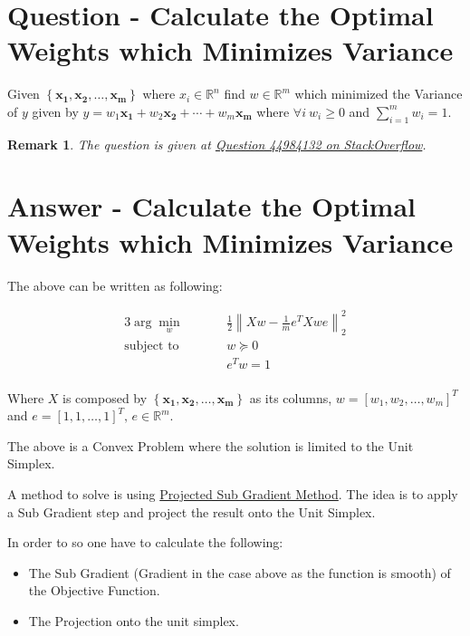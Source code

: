 \documentclass[]{article}
\newtheorem*{remark}{Remark}
\newcommand{\MyBrack}[1]{\left\lbrack #1 \right\rbrack}
\newcommand{\MyBrace}[1]{\left\lbrace #1 \right\rbrace}
\newcommand{\MyNormSqr}[2]{{\left\| #1 \right\|}_{#2}^{2}}
\newcommand{\MyNormTwoSqr}[1]{\MyNormSqr{#1}{2}}
\newcommand{\RR}[1]{\mathbb{R}^{#1}}
\begin{document}
	
	\section*{Question - Calculate the Optimal Weights which Minimizes Variance}
	
	Given $ \MyBrace{ \boldsymbol{{x}_{1}}, \boldsymbol{{x}_{2}}, \ldots, \boldsymbol{{x}_{m}} } $ where $ {x}_{i} \in \RR{n} $ find $ w \in \RR{m} $ which minimized the Variance of $ y $ given by $ y = {w}_{1} \boldsymbol{{x}_{1}} + {w}_{2} \boldsymbol{{x}_{2}} + \cdots + {w}_{m} \boldsymbol{{x}_{m}} $ where $ \forall i \: {w}_{i} \geq 0 $ and $ \sum_{i = 1}^{m} {w}_{i} = 1 $.
	
	\begin{remark}
		The question is given at \href{https://stackoverflow.com/questions/44984132}{Question 44984132 on StackOverflow}.
	\end{remark}
	
	\section*{Answer - Calculate the Optimal Weights which Minimizes Variance}
	
	The above can be written as following:
	
	\begin{alignat*}{3}
	\arg \min_{w} 		& \quad && \frac{1}{2} \MyNormTwoSqr{ X w - \frac{1}{m} {e}^{T} X w e } \\
	\text{subject to} 	& \quad && w \succeq 0 \\
						& \quad && {e}^{T} w = 1 \\
	\end{alignat*}
	
	Where $ X $ is composed by $ \MyBrace{ \boldsymbol{{x}_{1}}, \boldsymbol{{x}_{2}}, \ldots, \boldsymbol{{x}_{m}} } $ as its columns, $ w = \MyBrack{{w}_{1}, {w}_{2}, \ldots, {w}_{m}}^{T} $ and $ e = \MyBrack{1, 1, \ldots, 1}^{T}, \, e \in \RR{m} $.
	
	The above is a Convex Problem where the solution is limited to the Unit Simplex.
	
	A method to solve is using \href{https://en.wikipedia.org/wiki/Subgradient_method}{Projected Sub Gradient Method}. The idea is to apply a Sub Gradient step and project the result onto the Unit Simplex.
	
	In order to so one have to calculate the following:
	\begin{itemize}
		\item The Sub Gradient (Gradient in the case above as the function is smooth) of the Objective Function.
		\item The Projection onto the unit simplex.
	\end{itemize}
	
\end{document}
